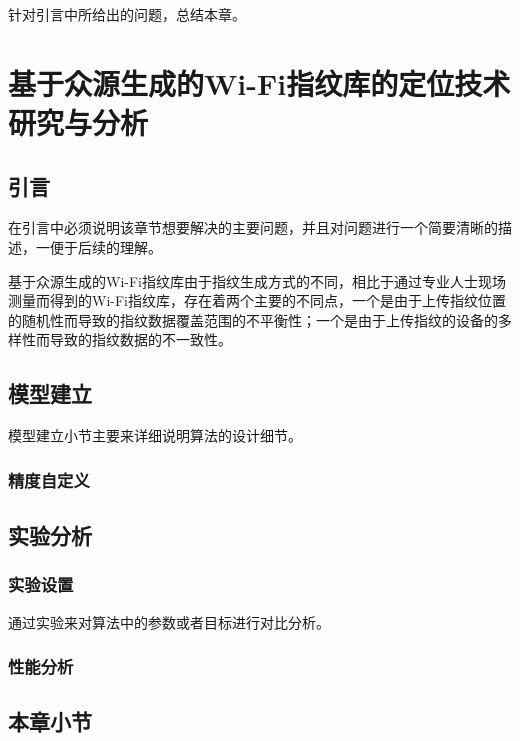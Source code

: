针对引言中所给出的问题，总结本章。




\chapter{基于众源生成的Wi-Fi指纹库的定位技术研究与分析}

\section{引言}

在引言中必须说明该章节想要解决的主要问题，并且对问题进行一个简要清晰的描述，一便于后续的理解\cite{montoliu2017indoorloc}。

基于众源生成的Wi-Fi指纹库由于指纹生成方式的不同，相比于通过专业人士现场测量而得到的Wi-Fi指纹库，存在着两个主要的不同点，一个是由于上传指纹位置的随机性而导致的指纹数据覆盖范围的不平衡性；一个是由于上传指纹的设备的多样性而导致的指纹数据的不一致性。

\section{模型建立}

模型建立小节主要来详细说明算法的设计细节。

\subsection{精度自定义}



\section{实验分析}

\subsection{实验设置}
通过实验来对算法中的参数或者目标进行对比分析。

\subsection{性能分析}

\section{本章小节}

